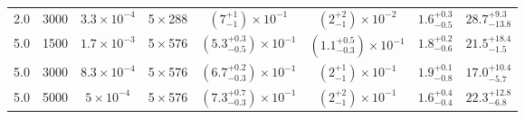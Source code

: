 \begin{table}
{{\begin{tabular}{
    c c c c
    c c c c
}
2.0 & 3000 & $3.3\times 10^{-4}$ & 5\,$\times$\,288 & $\left(7_{-1}^{+1}\right)\times 10^{-1}$ & $\left(2_{-1}^{+2}\right)\times 10^{-2}$ & $1.6_{-0.5}^{+0.3}$ & $28.7_{-13.8}^{+9.3}$ \\

5.0 & 1500 & $1.7\times 10^{-3}$ & 5\,$\times$\,576 & $\left(5.3_{-0.5}^{+0.3}\right)\times 10^{-1}$ & $\left(1.1_{-0.3}^{+0.5}\right)\times 10^{-1}$ & $1.8_{-0.6}^{+0.2}$ & $21.5_{-1.5}^{+18.4}$ \\

5.0 & 3000 & $8.3\times 10^{-4}$ & 5\,$\times$\,576 & $\left(6.7_{-0.3}^{+0.2}\right)\times 10^{-1}$ & $\left(2_{-1}^{+1}\right)\times 10^{-1}$ & $1.9_{-0.8}^{+0.1}$ & $17.0_{-5.7}^{+10.4}$ \\

5.0 & 5000 & $5\times 10^{-4}$ & 5\,$\times$\,576 & $\left(7.3_{-0.3}^{+0.7}\right)\times 10^{-1}$ & $\left(2_{-1}^{+2}\right)\times 10^{-1}$ & $1.6_{-0.4}^{+0.4}$ & $22.3_{-6.8}^{+12.8}$ \\
\hline
\hline
\end{tabular}
}%
}
\end{table}
